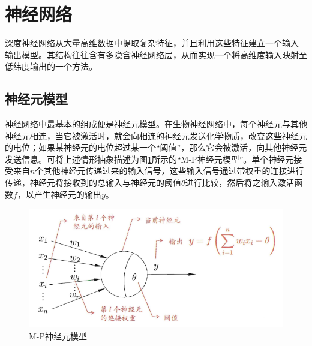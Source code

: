 \documentclass[zihao = -4,cn]{oucart}
\begin{document}
\newpage
\section{神经网络}
深度神经网络从大量高维数据中提取复杂特征，并且利用这些特征建立一个输入-输出模型。其结构往往含有多隐含神经网络层，从而实现一个将高维度输入映射至低纬度输出的一个方法。

\subsection{神经元模型}
神经网络中最基本的组成便是神经元模型。在生物神经网络中，每个神经元与其他神经元相连，当它被激活时，就会向相连的神经元发送化学物质，改变这些神经元的电位；如果某神经元的电位超过某一个“阈值”，那么它会被激活，向其他神经元发送信息。可将上述情形抽象描述为图\ref{fig:unit}所示的“M-P神经元模型”。单个神经元接受来自$n$个其他神经元传递过来的输入信号，这些输入信号通过带权重的连接进行传递，神经元将接收到的总输入与神经元的阈值$\theta$进行比较，然后将之输入激活函数$f$，以产生神经元的输出$y$。
\begin{figure}[h]
	\centering %
	\includegraphics[scale=0.7]{assets/unit}
	\caption{M-P神经元模型}
	\label{fig:unit}
\end{figure}
\end{document}

